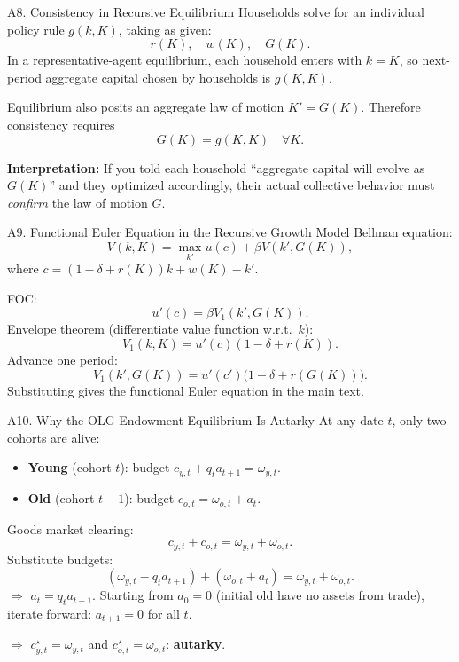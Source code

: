 \documentclass[aspectratio=169,10pt]{beamer}
\newcommand{\backbutton}[1]{\hfill\hyperlink{#1}{\beamerbutton{Back}}}
\begin{document}
\begin{frame}{A8. Consistency in Recursive Equilibrium}
\hypertarget{a8}{}
Households solve for an individual policy rule $g(k,K)$, taking as given:
\[
r(K),\quad w(K),\quad G(K).
\]
In a representative-agent equilibrium, each household enters with $k=K$, so next-period aggregate capital chosen by households is $g(K,K)$.

\medskip
Equilibrium also posits an aggregate law of motion $K'=G(K)$. Therefore consistency requires
\[
G(K)=g(K,K) \quad\forall K.
\]

\medskip
\textbf{Interpretation:} If you told each household ``aggregate capital will evolve as $G(K)$'' and they optimized accordingly, their actual collective behavior must \emph{confirm} the law of motion $G$.
\backbutton{m-a8}
\end{frame}

\begin{frame}{A9. Functional Euler Equation in the Recursive Growth Model}
\hypertarget{a9}{}
Bellman equation:
\[
V(k,K)=\max_{k'} u(c)+\beta V(k',G(K)),
\]
where $c=(1-\delta+r(K))k+w(K)-k'$.

\medskip
FOC:
\[
u'(c)=\beta V_1(k',G(K)).
\]
Envelope theorem (differentiate value function w.r.t.\ $k$):
\[
V_1(k,K)=u'(c)(1-\delta+r(K)).
\]
Advance one period:
\[
V_1(k',G(K))
=
u'(c')\big(1-\delta+r(G(K))\big).
\]
Substituting gives the functional Euler equation in the main text.
\backbutton{m-a9}
\end{frame}

\begin{frame}{A10. Why the OLG Endowment Equilibrium Is Autarky}
\hypertarget{a10}{}
At any date $t$, only two cohorts are alive:
\begin{itemize}
  \item \textbf{Young} (cohort $t$): budget $c_{y,t}+q_t a_{t+1}=\omega_{y,t}$.
  \item \textbf{Old} (cohort $t-1$): budget $c_{o,t}=\omega_{o,t}+a_t$.
\end{itemize}

Goods market clearing:
\[
c_{y,t}+c_{o,t}=\omega_{y,t}+\omega_{o,t}.
\]
Substitute budgets:
\[
(\omega_{y,t}-q_t a_{t+1})+(\omega_{o,t}+a_t)=\omega_{y,t}+\omega_{o,t}.
\]
$\Rightarrow$ $a_t = q_t a_{t+1}$. Starting from $a_0=0$ (initial old have no assets from trade), iterate forward: $a_{t+1}=0$ for all $t$.

\medskip
$\Rightarrow$ $c_{y,t}^\star=\omega_{y,t}$ and $c_{o,t}^\star=\omega_{o,t}$: \textbf{autarky}.
\backbutton{m-a10}
\end{frame}
\end{document}
